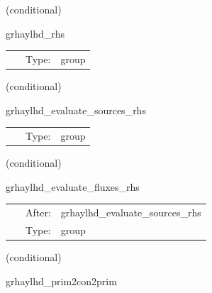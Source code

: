 \vspace{5mm}

   (conditional) 

\hspace{5mm} grhaylhd\_rhs 

\hspace{5mm}{\it evaluate rhss grhd equations } 


\hspace{5mm}

 \begin{tabular*}{160mm}{cll} 
~ & Type:  & group \\ 
\end{tabular*} 


\vspace{5mm}

   (conditional) 

\hspace{5mm} grhaylhd\_evaluate\_sources\_rhs 

\hspace{5mm}{\it evaluate source terms in grhd rhss } 


\hspace{5mm}

 \begin{tabular*}{160mm}{cll} 
~ & Type:  & group \\ 
\end{tabular*} 


\vspace{5mm}

   (conditional) 

\hspace{5mm} grhaylhd\_evaluate\_fluxes\_rhs 

\hspace{5mm}{\it evaluate flux terms in grhd rhss } 


\hspace{5mm}

 \begin{tabular*}{160mm}{cll} 
~ & After:  & grhaylhd\_evaluate\_sources\_rhs \\ 
~ & Type:  & group \\ 
\end{tabular*} 


\vspace{5mm}

   (conditional) 

\hspace{5mm} grhaylhd\_prim2con2prim 

